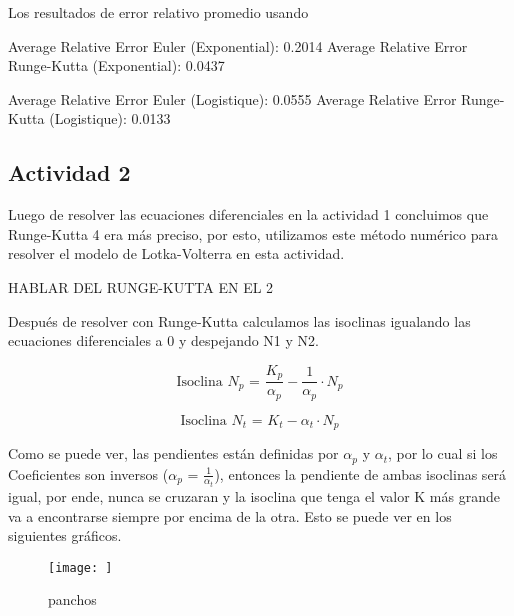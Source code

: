 \documentclass{article}
\begin{document}
\noindent Los resultados de error relativo promedio usando 

Average Relative Error Euler (Exponential): 0.2014
Average Relative Error Runge-Kutta (Exponential): 0.0437

Average Relative Error Euler (Logistique): 0.0555
Average Relative Error Runge-Kutta (Logistique): 0.0133








\subsection*{Actividad 2}
\noindent Luego de resolver las ecuaciones diferenciales en la actividad 1 concluimos que Runge-Kutta 4 era más preciso, por esto, utilizamos este método numérico para resolver el modelo de Lotka-Volterra en esta actividad. 
\vspace{1\baselineskip}
\vspace{1\baselineskip}



\noindent HABLAR DEL RUNGE-KUTTA EN EL 2
\vspace{1\baselineskip}



\noindent Después de resolver con Runge-Kutta calculamos las isoclinas igualando las ecuaciones diferenciales a 0 y despejando N1 y N2.
\vspace{0.5\baselineskip}

\begin{equation}
\text{Isoclina $N_p$ = } \frac{K_p}{\alpha_{p}} - \frac{1}{\alpha_{p}} \cdot N_p
\end{equation}

\begin{equation}
\text{Isoclina $N_t$ = } K_t - \alpha_{t} \cdot N_p
\end{equation}
\vspace{0.75\baselineskip}

\noindent Como se puede ver, las pendientes están definidas por $\alpha_p$ y $\alpha_t$, por lo cual si los Coeficientes son inversos ($\alpha_p$ = $\frac{1}{\alpha_t}$), entonces la pendiente de ambas isoclinas será igual, por ende, nunca se cruzaran y la isoclina que tenga el valor K más grande va a encontrarse siempre por encima de la otra. Esto se puede ver en los siguientes gráficos.

\begin{figure}[ht]
    \centering
    \caption{panchos}
    \texttt{[image: ]}
    \label{fig:Image 1.1}
\end{figure}
\end{document}
